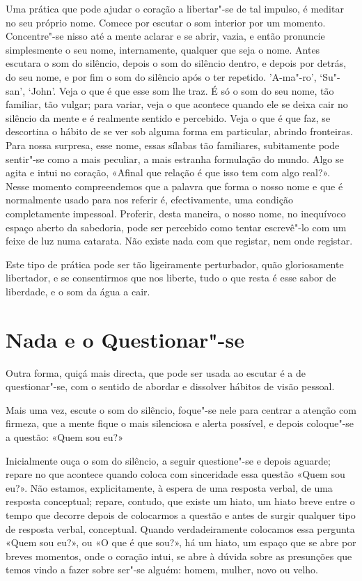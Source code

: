 Uma prática que pode ajudar o coração a libertar"-se de tal impulso, é
meditar no seu próprio nome. Comece por escutar o som interior por um
momento. Concentre"-se nisso até a mente aclarar e se abrir, vazia, e
então pronuncie simplesmente o seu nome, internamente, qualquer que seja
o nome. Antes escutara o som do silêncio, depois o som do silêncio
dentro, e depois por detrás, do seu nome, e por fim o som do silêncio
após o ter repetido. 'A-ma"-ro', `Su"-san', `John'. Veja o que é que esse
som lhe traz. É só o som do seu nome, tão familiar, tão vulgar; para
variar, veja o que acontece quando ele se deixa cair no silêncio da
mente e é realmente sentido e percebido. Veja o que é que faz, se
descortina o hábito de se ver sob alguma forma em particular, abrindo
fronteiras. Para nossa surpresa, esse nome, essas sílabas tão
familiares, subitamente pode sentir"-se como a mais peculiar, a mais
estranha formulação do mundo. Algo se agita e intui no coração, «Afinal
que relação é que isso tem com algo real?». Nesse momento compreendemos
que a palavra que forma o nosso nome e que é normalmente usado para nos
referir é, efectivamente, uma condição completamente impessoal.
Proferir, desta maneira, o nosso nome, no inequívoco espaço aberto da
sabedoria, pode ser percebido como tentar escrevê"-lo com um feixe de luz
numa catarata. Não existe nada com que registar, nem onde registar.

Este tipo de prática pode ser tão ligeiramente perturbador, quão
gloriosamente libertador, e se consentirmos que nos liberte, tudo o que
resta é esse sabor de liberdade, e o som da água a cair.

\section{Nada e o Questionar"-se}

Outra forma, quiçá mais directa, que pode ser usada ao escutar é a de
questionar"-se, com o sentido de abordar e dissolver hábitos de visão
pessoal.

Mais uma vez, escute o som do silêncio, foque"-se nele para centrar a
atenção com firmeza, que a mente fique o mais silenciosa e alerta
possível, e depois coloque"-se a questão: «Quem sou eu?»

Inicialmente ouça o som do silêncio, a seguir questione"-se e depois
aguarde; repare no que acontece quando coloca com sinceridade essa
questão «Quem sou eu?». Não estamos, explicitamente, à espera de uma
resposta verbal, de uma resposta conceptual; repare, contudo, que existe
um hiato, um hiato breve entre o tempo que decorre depois de colocarmos
a questão e antes de surgir qualquer tipo de resposta verbal,
conceptual. Quando verdadeiramente colocamos essa pergunta «Quem sou
eu?», ou «O que é que sou?», há um hiato, um espaço que se abre por
breves momentos, onde o coração intui, se abre à dúvida sobre as
presunções que temos vindo a fazer sobre ser"-se alguém: homem, mulher,
novo ou velho.


